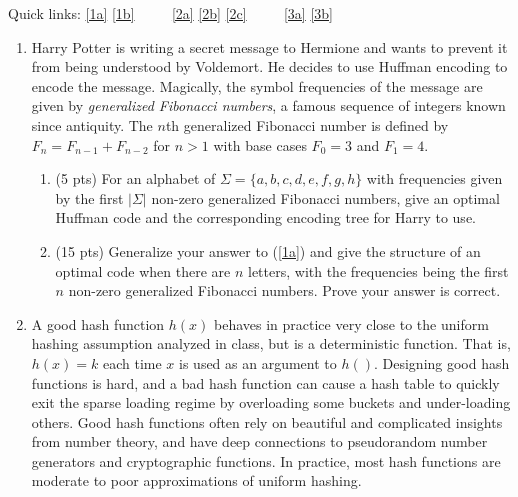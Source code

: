 \documentclass[12pt]{article}
\begin{document}
\renewcommand{\headrulewidth}{0.5pt}
\phantom{Test}

Quick links: \ref{1a} \ref{1b} $\qquad$ \ref{2a} \ref{2b} \ref{2c} $\qquad$ \ref{3a} \ref{3b} 
\vspace{-3mm}

\vspace{-3mm}
\begin{enumerate}
		 
	\item Harry Potter is writing a secret message to Hermione and wants to prevent it from being understood by Voldemort. He decides to use Huffman encoding to encode the message. Magically, the symbol frequencies of the message are given by \textit{generalized Fibonacci numbers}, a famous sequence of integers known since antiquity. The $n$th generalized Fibonacci number is defined by $F_{n} = F_{n-1}+F_{n-2}$ for $n>1$ with base cases $F_{0}=3$ and $F_{1}=4$.
	\begin{enumerate}
	\item (5 pts) \label{1a} For an alphabet of $\Sigma=\{a,b,c,d,e,f,g,h\}$ with frequencies given by the first $|\Sigma|$ non-zero generalized Fibonacci numbers, give an optimal Huffman code and the corresponding encoding tree for Harry to use.
    \pagebreak	
    	
	\item (15 pts) \label{1b} Generalize your answer to (\ref{1a}) and give the structure of an optimal code when there are $n$ letters, with the frequencies being the first $n$ non-zero generalized Fibonacci numbers. Prove your answer is correct.
    \pagebreak	
    	
	\end{enumerate}



	\item A good hash function $h(x)$ behaves in practice very close to the uniform hashing assumption analyzed in class, but is a deterministic function. That is, $h(x)=k$ each time $x$ is used as an argument to $h()$. Designing good hash functions is hard, and a bad hash function can cause a hash table to quickly exit the sparse loading regime by overloading some buckets and under-loading others. Good hash functions often rely on beautiful and complicated insights from number theory, and have deep connections to pseudorandom number generators and cryptographic functions. In practice, most hash functions are moderate to poor approximations of uniform hashing.
	

\end{enumerate}
\end{document}
